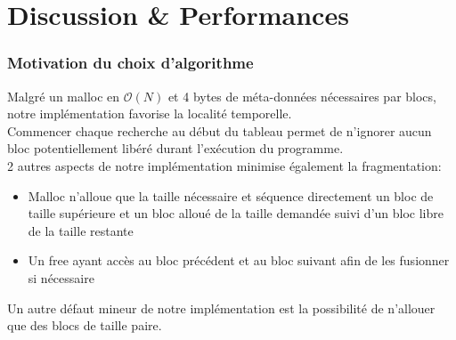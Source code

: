 \documentclass{article}
\begin{document}
\section{Discussion \& Performances}
\label{perf}

\subsubsection*{Motivation du choix d'algorithme}
Malgré un malloc en $\mathcal{O}(N)$ et 4 bytes de méta-données nécessaires par blocs, notre implémentation favorise la localité temporelle.\\
Commencer chaque recherche au début du tableau permet de n'ignorer aucun bloc potentiellement libéré durant l'exécution du programme.\\
2 autres aspects de notre implémentation minimise également la fragmentation:
\begin{itemize}
    \item Malloc n'alloue que la taille nécessaire et séquence directement un bloc de taille supérieure et un bloc alloué de la taille demandée suivi d'un bloc libre de la taille restante 
    \item Un free ayant accès au bloc précédent et au bloc suivant afin de les fusionner si nécessaire\newline
\end{itemize}

Un autre défaut mineur de notre implémentation est la possibilité de n'allouer que des blocs de taille paire.
\end{document}

